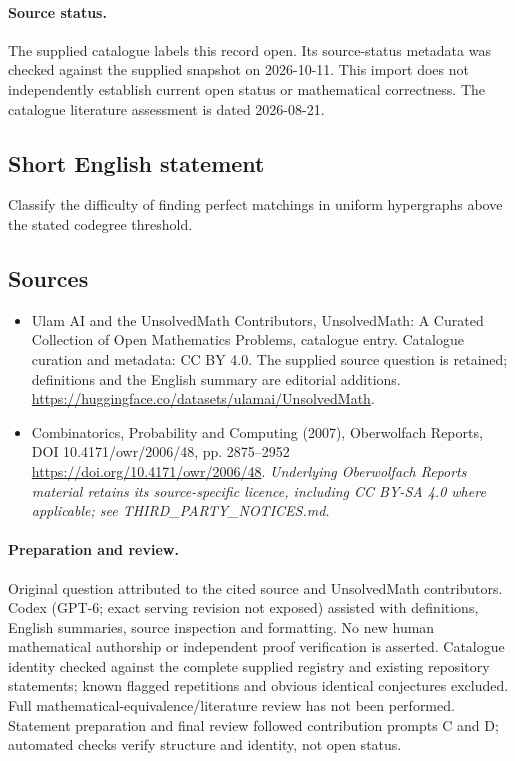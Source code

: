 \documentclass[11pt]{article}
\begin{document}
\paragraph{Source status.}
The supplied catalogue labels this record open. Its source-status metadata was checked against the supplied snapshot on 2026-10-11. This import does not independently establish current open status or mathematical correctness. The catalogue literature assessment is dated 2026-08-21.
\subsection{Short English statement}
Classify the difficulty of finding perfect matchings in uniform hypergraphs above the stated codegree threshold.
\subsection{Sources}
\begin{itemize}
\item[S1] Ulam AI and the UnsolvedMath Contributors, UnsolvedMath: A Curated Collection of Open Mathematics Problems, catalogue entry. Catalogue curation and metadata: CC BY 4.0. The supplied source question is retained; definitions and the English summary are editorial additions.
\url{https://huggingface.co/datasets/ulamai/UnsolvedMath}.
\item[S2] Combinatorics, Probability and Computing (2007), Oberwolfach Reports, DOI 10.4171/owr/2006/48, pp. 2875--2952
\url{https://doi.org/10.4171/owr/2006/48}.
\textit{Underlying Oberwolfach Reports material retains its source-specific licence, including CC BY-SA 4.0 where applicable; see THIRD\_PARTY\_NOTICES.md.}
\end{itemize}
\paragraph{Preparation and review.}
Original question attributed to the cited source and UnsolvedMath contributors. Codex (GPT-6; exact serving revision not exposed) assisted with definitions, English summaries, source inspection and formatting. No new human mathematical authorship or independent proof verification is asserted. Catalogue identity checked against the complete supplied registry and existing repository statements; known flagged repetitions and obvious identical conjectures excluded. Full mathematical-equivalence/literature review has not been performed. Statement preparation and final review followed contribution prompts C and D; automated checks verify structure and identity, not open status.
\label{end:statement}
\end{document}
